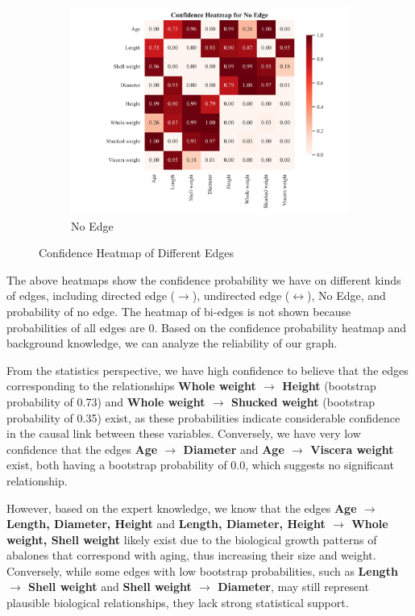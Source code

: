 \documentclass{article}
\begin{document}
\begin{figure}[H]
\begin{subfigure}{0.32\textwidth}
        \centering
        \includegraphics[width=\linewidth]{./demo_data/20241104_132155/Abalone/output_graph/non_existence_confidence_heatmap.jpg}
        \caption{No Edge}
    \end{subfigure}
    \caption{Confidence Heatmap of Different Edges}
\end{figure}        
The above heatmaps show the confidence probability we have on different kinds of edges, including directed edge ($\rightarrow$), undirected edge ($\leftrightarrow$), No Edge, and probability of no edge. The heatmap of bi-edges is not shown because probabilities of all edges are 0. Based on the confidence probability heatmap and background knowledge, we can analyze the reliability of our graph.

From the statistics perspective, we have high confidence to believe that the edges corresponding to the relationships \textbf{Whole weight $\rightarrow$ Height} (bootstrap probability of 0.73) and \textbf{Whole weight $\rightarrow$ Shucked weight} (bootstrap probability of 0.35) exist, as these probabilities indicate considerable confidence in the causal link between these variables. Conversely, we have very low confidence that the edges \textbf{Age $\rightarrow$ Diameter} and \textbf{Age $\rightarrow$ Viscera weight} exist, both having a bootstrap probability of 0.0, which suggests no significant relationship.

However, based on the expert knowledge, we know that the edges \textbf{Age $\rightarrow$ Length, Diameter, Height} and \textbf{Length, Diameter, Height $\rightarrow$ Whole weight, Shell weight} likely exist due to the biological growth patterns of abalones that correspond with aging, thus increasing their size and weight. Conversely, while some edges with low bootstrap probabilities, such as \textbf{Length $\rightarrow$ Shell weight} and \textbf{Shell weight $\rightarrow$ Diameter}, may still represent plausible biological relationships, they lack strong statistical support.
\end{document}

